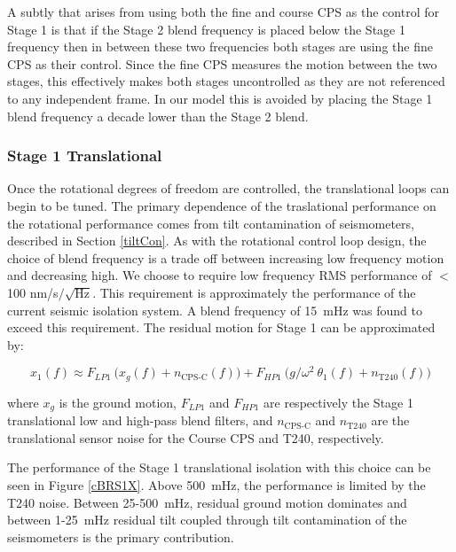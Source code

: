 \documentclass [12pt, proquest]{uwthesis}[2019]
\begin{document}
A subtly that arises from using both the fine and course CPS as the control for Stage 1 is that if the Stage 2 blend frequency is placed below the Stage 1 frequency then in between these two frequencies both stages are using the fine CPS as their control. Since the fine CPS measures the motion between the two stages, this effectively makes both stages uncontrolled as they are not referenced to any independent frame. In our model this is avoided by placing the Stage 1 blend frequency a decade lower than the Stage 2 blend.

\subsubsection{Stage 1 Translational}

Once the rotational degrees of freedom are controlled, the translational loops can begin to be tuned. The primary dependence of the traslational performance on the rotational performance comes from tilt contamination of seismometers, described in Section \ref{tiltCon}. As with the rotational control loop design, the choice of blend frequency is a trade off between increasing low frequency motion and decreasing high. We choose to require low frequency RMS performance of $<$ 100 nm/s$/\sqrt{\text{Hz}}$. This requirement is approximately the performance of the current seismic isolation system. A blend frequency of 15~mHz was found to exceed this requirement. The residual motion for Stage 1 can be approximated by:

\begin{equation}
x_1(f)\approx F_{LP1}\ \big(x_g(f)+n_\text{CPS-C}(f)\big)+F_{HP1}\ \big( g/\omega^2\ \theta_1(f) +n_\text{T240}(f) \big)
\end{equation}

where $x_g$ is the ground motion, $F_{LP1}$ and $F_{HP1}$ are respectively the Stage 1 translational low and high-pass blend filters, and $n_\text{CPS-C}$ and $n_\text{T240}$ are the translational sensor noise for the Course CPS and T240, respectively.

The performance of the Stage 1 translational isolation with this choice can be seen in Figure \ref{cBRS1X}. Above 500~mHz, the performance is limited by the T240 noise. Between 25-500~mHz, residual ground motion dominates and between 1-25~mHz residual tilt coupled through tilt contamination of the seismometers is the primary contribution. 
\end{document}
